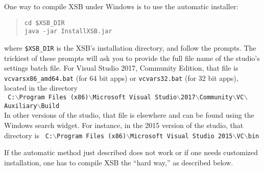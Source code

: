 One way to compile XSB under Windows is to use the automatic installer:
\begin{quote}
\texttt{cd \$XSB\_DIR}   
\\
\texttt{java -jar InstallXSB.jar}
\end{quote}
where \texttt{\$XSB\_DIR} is the XSB's installation directory,
and follow the prompts. The trickiest of these prompts will ask you to provide the
full file name of the studio's settings batch file.
For Visual Studio 2017, Community Edition,
that file is \texttt{vcvarsx86\_amd64.bat} (for 64 bit apps) or
  \texttt{vcvars32.bat} (for 32 bit apps), located in the directory
  \vspace{1mm}\\
\texttt{
      C:$\backslash$Program Files\,(x86)$\backslash$Microsoft Visual Studio$\backslash$2017$\backslash$Community$\backslash$VC$\backslash$Auxiliary$\backslash$Build
    }
    \\
    In other versions of the studio, that file is elsewhere and can be
    found using the Windows search widget. For instance, in the 2015
    version of the studio, that directory is
\texttt{
      C:$\backslash$Program Files\,(x86)$\backslash$Microsoft Visual Studio 2015$\backslash$VC$\backslash$bin
    }

If the automatic method just described
does not work or if one needs customized installation,
one has to compile XSB the ``hard
way,'' as described below.

